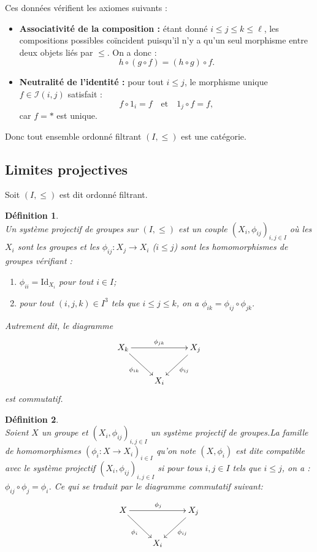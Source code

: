 \documentclass[a4paper, 14pt]{report}
\newtheorem{definition}{Définition}[section]
\begin{document}
\begin{onehalfspace}
{Ces données vérifient les axiomes suivants :
\begin{itemize}
	\item \textbf{Associativité de la composition :} étant donné \( i \leq j \leq k \leq \ell \), les compositions possibles coïncident puisqu'il n’y a qu’un seul morphisme entre deux objets liés par \( \leq \). On a donc :
	\[
	h \circ (g \circ f) = (h \circ g) \circ f.
	\]
	\item \textbf{Neutralité de l'identité :} pour tout \( i \leq j \), le morphisme unique \( f \in \mathcal{I}(i, j) \) satisfait :
	\[
	f \circ 1_i = f \quad \text{et} \quad 1_j \circ f = f,
	\]
	car \( f = \ast \) est unique.
\end{itemize}
Donc tout ensemble ordonné filtrant \( (I, \leq) \) est une catégorie.



\subsection{Limites projectives}
Soit $(I,\leq)$ est dit ordonné filtrant.
\begin{definition} \cite{maclane1971categories}\\
	Un système projectif de groupes sur $(I,\leq)$ est un couple $(X_{i},\phi_{ij})_{i,j \in I}$ où les $X_{i}$ sont les groupes et les $\phi_{ij}:X_{j} \rightarrow X_{i}$  ($i \leq j$) sont les homomorphismes de groupes vérifiant :
	\begin{enumerate}[label=\roman*)]
		\item $\phi_{ii} = \text{Id}_{X_{i}}$ pour tout $i \in I$;
		\item pour tout $(i,j,k) \in I^{3}$ tels que $i \leq j \leq k$, on a $\phi_{ik} = \phi_{ij} \circ \phi_{jk}$.
	\end{enumerate}
	Autrement dit, le diagramme
	\[
	\xymatrix{
		X_{k} \ar[rr]^{\phi_{jk}} \ar[dr]_{\phi_{ik}} & & X_{j} \ar[dl]^{\phi_{ij}} \\
		& X_{i} &
	}
	\]
	est commutatif.
\end{definition}


\begin{definition}  \cite{maclane1971categories}\\
Soient $X$ un groupe et $(X_{i}, \phi_{ij})_{i,j \in I}$ un système projectif de groupes.La famille de homomorphismes $(\phi_{i} : X \rightarrow X_{i})_{i \in I}$ qu'on note $( X ,\phi_{i})$ est dite compatible avec le système projectif $(X_{i}, \phi_{ij})_{i,j \in I}$ si pour tous $i,j \in I$ tels que $i \leq j$, on a : $\phi_{ij} \circ \phi_{j} = \phi_{i}$.
	Ce qui se traduit par le diagramme commutatif suivant:
	\[
	\xymatrix{
		X \ar[rr]^{\phi_{j}} \ar[dr]_{\phi_{i}} & & X_{j} \ar[dl]^{\phi_{ij}} \\
		& X_{i} &
	}
	\]
	

\end{definition}}
\end{onehalfspace}
\end{document}
